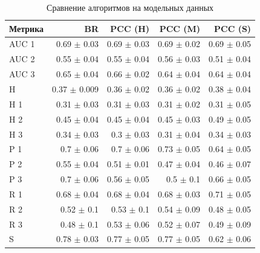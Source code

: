 \documentclass{ITaSconf}
\newcommand\headline{\hline}
\begin{document}
\begin{table}[p]%
	\caption{Сравнение алгоритмов на модельных данных}
	\label{t:modelData}
	\centering\medskip%
	\begin{tabular}{lrrrr}
		\headline
		Метрика &             BR &         PCC (H) &         PCC (M) &         PCC (S) \\
		\headline
		AUC 1 &   0.69 $\pm$ 0.03 &  0.69 $\pm$ 0.03 &  0.69 $\pm$ 0.02 &  0.69 $\pm$ 0.05 \\
		AUC 2 &   0.55 $\pm$ 0.04 &  0.55 $\pm$ 0.04 &  0.56 $\pm$ 0.03 &  0.51 $\pm$ 0.04 \\
		AUC 3 &   0.65 $\pm$ 0.04 &  0.66 $\pm$ 0.02 &  0.64 $\pm$ 0.04 &  0.64 $\pm$ 0.04 \\
		H     &  0.37 $\pm$ 0.009 &  0.36 $\pm$ 0.02 &  0.36 $\pm$ 0.02 &  0.38 $\pm$ 0.04 \\
		H 1   &   0.31 $\pm$ 0.03 &  0.31 $\pm$ 0.03 &  0.31 $\pm$ 0.02 &  0.31 $\pm$ 0.05 \\
		H 2   &   0.45 $\pm$ 0.04 &  0.45 $\pm$ 0.04 &  0.45 $\pm$ 0.03 &  0.49 $\pm$ 0.05 \\
		H 3   &   0.34 $\pm$ 0.03 &   0.3 $\pm$ 0.03 &  0.31 $\pm$ 0.04 &  0.34 $\pm$ 0.03 \\
		P 1   &    0.7 $\pm$ 0.06 &   0.7 $\pm$ 0.06 &  0.73 $\pm$ 0.05 &  0.64 $\pm$ 0.05 \\
		P 2   &   0.55 $\pm$ 0.04 &  0.51 $\pm$ 0.01 &  0.47 $\pm$ 0.04 &  0.46 $\pm$ 0.07 \\
		P 3   &    0.7 $\pm$ 0.06 &  0.56 $\pm$ 0.05 &    0.5 $\pm$ 0.1 &  0.66 $\pm$ 0.05 \\
		R 1   &   0.68 $\pm$ 0.04 &  0.68 $\pm$ 0.04 &  0.68 $\pm$ 0.03 &  0.71 $\pm$ 0.05 \\
		R 2   &    0.52 $\pm$ 0.1 &   0.53 $\pm$ 0.1 &  0.54 $\pm$ 0.09 &  0.48 $\pm$ 0.05 \\
		R 3   &    0.48 $\pm$ 0.1 &  0.53 $\pm$ 0.06 &  0.52 $\pm$ 0.07 &  0.49 $\pm$ 0.09 \\
		S     &   0.78 $\pm$ 0.03 &  0.77 $\pm$ 0.05 &  0.77 $\pm$ 0.05 &  0.62 $\pm$ 0.06 \\
		\headline
	\end{tabular}
\end{table}
\end{document}
